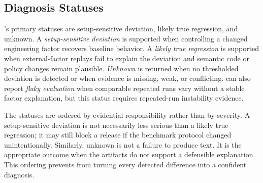 \subsection{Diagnosis Statuses}

\sys's primary statuses are setup-sensitive deviation, likely true regression, and unknown. A \emph{setup-sensitive deviation} is supported when controlling a changed engineering factor recovers baseline behavior. A \emph{likely true regression} is supported when external-factor replays fail to explain the deviation and semantic code or policy changes remain plausible. \emph{Unknown} is returned when no thresholded deviation is detected or when evidence is missing, weak, or conflicting. \sys can also report \emph{flaky evaluation} when comparable repeated runs vary without a stable factor explanation, but this status requires repeated-run instability evidence.

The statuses are ordered by evidential responsibility rather than by severity. A setup-sensitive deviation is not necessarily less serious than a likely true regression; it may still block a release if the benchmark protocol changed unintentionally. Similarly, unknown is not a failure to produce text. It is the appropriate outcome when the artifacts do not support a defensible explanation. This ordering prevents \sys from turning every detected difference into a confident diagnosis.
